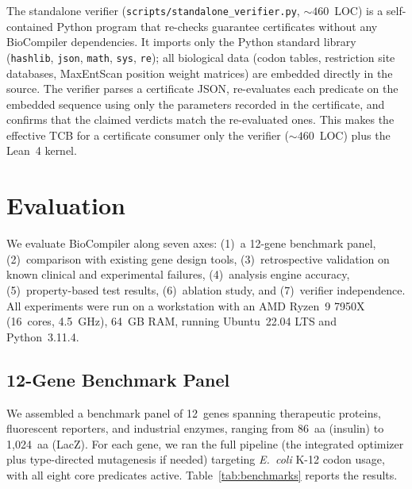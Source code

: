 The standalone verifier (\texttt{scripts/standalone\_verifier.py}, ${\sim}460$~LOC) is a
self-contained Python program that re-checks guarantee certificates
without any BioCompiler dependencies.  It imports only the Python
standard library (\texttt{hashlib}, \texttt{json}, \texttt{math},
\texttt{sys}, \texttt{re}); all biological data (codon tables,
restriction site databases, MaxEntScan position weight matrices) are
embedded directly in the source.  The verifier parses a certificate JSON,
re-evaluates each predicate on the embedded sequence using only the
parameters recorded in the certificate, and confirms that the claimed
verdicts match the re-evaluated ones.  This makes the effective TCB for a
certificate consumer only the verifier (${\sim}460$~LOC) plus the
Lean~4 kernel.


\FloatBarrier
\section{Evaluation}\label{sec:eval}

We evaluate BioCompiler along seven axes: (1)~a 12-gene benchmark panel,
(2)~comparison with existing gene design tools, (3)~retrospective
validation on known clinical and experimental failures, (4)~analysis
engine accuracy, (5)~property-based test results, (6)~ablation study,
and (7)~verifier independence.  All experiments were run on a
workstation with an AMD Ryzen~9 7950X (16~cores, 4.5~GHz), 64~GB RAM,
running Ubuntu~22.04 LTS and Python~3.11.4.

\subsection{12-Gene Benchmark Panel}\label{sec:benchmark}

We assembled a benchmark panel of 12~genes spanning therapeutic proteins,
fluorescent reporters, and industrial enzymes, ranging from 86~aa
(insulin) to 1,024~aa (LacZ).  For each gene, we ran the full pipeline
(the integrated optimizer plus type-directed mutagenesis if needed) targeting
\emph{E.~coli} K-12 codon usage, with all eight core predicates active.
Table~\ref{tab:benchmarks} reports the results.

